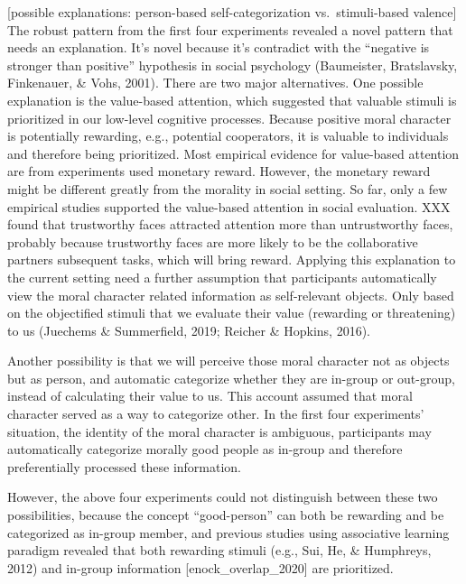 \documentclass[
  english,
  man]{apa6}
\begin{document}
{[}possible explanations: person-based self-categorization vs.~stimuli-based valence{]} The robust pattern from the first four experiments revealed a novel pattern that needs an explanation. It's novel because it's contradict with the ``negative is stronger than positive'' hypothesis in social psychology (Baumeister, Bratslavsky, Finkenauer, \& Vohs, 2001). There are two major alternatives. One possible explanation is the value-based attention, which suggested that valuable stimuli is prioritized in our low-level cognitive processes. Because positive moral character is potentially rewarding, e.g., potential cooperators, it is valuable to individuals and therefore being prioritized. Most empirical evidence for value-based attention are from experiments used monetary reward. However, the monetary reward might be different greatly from the morality in social setting. So far, only a few empirical studies supported the value-based attention in social evaluation. XXX found that trustworthy faces attracted attention more than untrustworthy faces, probably because trustworthy faces are more likely to be the collaborative partners subsequent tasks, which will bring reward. Applying this explanation to the current setting need a further assumption that participants automatically view the moral character related information as self-relevant objects. Only based on the objectified stimuli that we evaluate their value (rewarding or threatening) to us (Juechems \& Summerfield, 2019; Reicher \& Hopkins, 2016).

Another possibility is that we will perceive those moral character not as objects but as person, and automatic categorize whether they are in-group or out-group, instead of calculating their value to us. This account assumed that moral character served as a way to categorize other. In the first four experiments' situation, the identity of the moral character is ambiguous, participants may automatically categorize morally good people as in-group and therefore preferentially processed these information.

However, the above four experiments could not distinguish between these two possibilities, because the concept ``good-person'' can both be rewarding and be categorized as in-group member, and previous studies using associative learning paradigm revealed that both rewarding stimuli (e.g., Sui, He, \& Humphreys, 2012) and in-group information {[}enock\_overlap\_2020{]} are prioritized.
\end{document}
